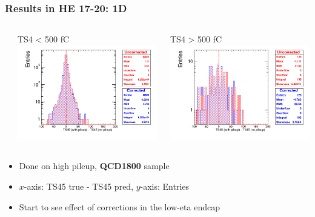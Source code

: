 \documentclass[bigger]{beamer}
\providecommand{\alert}[1]{\textbf{#1}}
\begin{document}
\begin{frame}
\frametitle{Results in HE 17-20: 1D}
\label{sec-3-3-8}
\begin{columns} %
\label{sec-3-3-8-1}
\begin{column}{0.55\textwidth}
\label{sec-3-3-8-1-1}

\centering
TS4 < 500 fC
\includegraphics[width=\textwidth]{fig/correction_comparison_1D_sample1800_under500_ring1.png}
\end{column}
\begin{column}{0.55\textwidth}
\label{sec-3-3-8-1-2}

\centering
TS4 > 500 fC
\includegraphics[width=\textwidth]{fig/correction_comparison_1D_sample1800_over500_ring1.png}
\end{column}
\end{columns}
\label{sec-3-3-8-2}
\begin{itemize}

\item Done on high pileup, \alert{QCD1800} sample
\label{sec-3-3-8-2-1}%

\item $x$-axis: TS45 true - TS45 pred, $y$-axis: Entries
\label{sec-3-3-8-2-2}%

\item Start to see effect of corrections in the low-eta endcap
\label{sec-3-3-8-2-3}%
\end{itemize} %
\end{frame}
\end{document}
